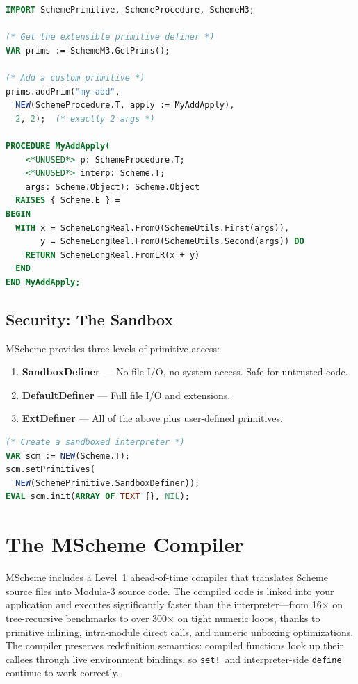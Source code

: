 \documentclass[12pt]{report}
\begin{document}
\begin{lstlisting}[language=Modula3]
IMPORT SchemePrimitive, SchemeProcedure, SchemeM3;

(* Get the extensible primitive definer *)
VAR prims := SchemeM3.GetPrims();

(* Add a custom primitive *)
prims.addPrim("my-add",
  NEW(SchemeProcedure.T, apply := MyAddApply),
  2, 2);  (* exactly 2 args *)

PROCEDURE MyAddApply(
    <*UNUSED*> p: SchemeProcedure.T;
    <*UNUSED*> interp: Scheme.T;
    args: Scheme.Object): Scheme.Object
  RAISES { Scheme.E } =
BEGIN
  WITH x = SchemeLongReal.FromO(SchemeUtils.First(args)),
       y = SchemeLongReal.FromO(SchemeUtils.Second(args)) DO
    RETURN SchemeLongReal.FromLR(x + y)
  END
END MyAddApply;
\end{lstlisting}

\section{Security: The Sandbox}

MScheme provides three levels of primitive access:

\begin{enumerate}
\item \textbf{SandboxDefiner} --- No file I/O, no system access.  Safe
  for untrusted code.
\item \textbf{DefaultDefiner} --- Full file I/O and extensions.
\item \textbf{ExtDefiner} --- All of the above plus user-defined primitives.
\end{enumerate}

\begin{lstlisting}[language=Modula3]
(* Create a sandboxed interpreter *)
VAR scm := NEW(Scheme.T);
scm.setPrimitives(
  NEW(SchemePrimitive.SandboxDefiner));
EVAL scm.init(ARRAY OF TEXT {}, NIL);
\end{lstlisting}


\chapter{The MScheme Compiler}\label{ch:compiler}

MScheme includes a Level~1 ahead-of-time compiler that translates
Scheme source files into Modula-3 source code.  The compiled code
is linked into your application and executes significantly faster than
the interpreter---from 16$\times$ on tree-recursive benchmarks to over
300$\times$ on tight numeric loops, thanks to primitive inlining,
intra-module direct calls, and numeric unboxing optimizations.
The compiler preserves redefinition semantics: compiled functions look
up their callees through live environment bindings, so \texttt{set!}\
and interpreter-side \texttt{define} continue to work correctly.
\end{document}
